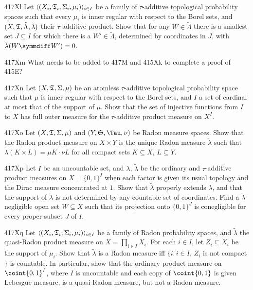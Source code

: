 {\spheader 417Xl Let
$\langle(X_i,\frak T_i,\Sigma_i,\mu_i)\rangle_{i\in I}$ be a family of
$\tau$-additive topological probability spaces such
that every $\mu_i$ is inner regular with respect to the Borel sets, and
$(X,\frak T,\tilde\Lambda,\tilde\lambda)$ their $\tau$-additive product.
Show that for any $W\in\tilde\Lambda$ there is a smallest set
$J\subseteq I$ for which there is a $W'\in\tilde\Lambda$, determined by
coordinates in $J$, with $\tilde\lambda(W\symmdiff W')=0$.  

\spheader 417Xm What needs to be added to 417M and 415Xk
to complete a proof of 415E?

\spheader 417Xn Let $(X,\frak T,\Sigma,\mu)$ be an atomless
$\tau$-additive topological probability space such that $\mu$ is inner
regular with respect to the Borel sets, and $I$ a set of cardinal at
most that of the support of $\mu$.   Show that the set of injective
functions from $I$ to $X$ has full outer measure for the $\tau$-additive
product measure on $X^I$.

\sqheader 417Xo Let $(X,\frak T,\Sigma,\mu)$ and $(Y,\frak S,\Tau,\nu)$
be Radon measure spaces.   Show that the Radon product measure on
$X\times Y$ is the unique Radon measure $\tilde\lambda$ such that
$\tilde\lambda(K\times L)=\mu K\cdot\nu L$ for all compact sets
$K\subseteq X$, $L\subseteq Y$.

\sqheader 417Xp Let $I$ be an uncountable set, and $\lambda$,
$\tilde\lambda$ be the ordinary and $\tau$-additive product measures on
$X=\{0,1\}^I$ when each factor is given its usual topology and the Dirac
measure concentrated at $1$.   Show that $\tilde\lambda$ properly extends
$\lambda$, and that the support of
$\tilde\lambda$ is not determined by any countable
set of coordinates.   Find a $\tilde\lambda$-negligible open set
$W\subseteq X$ such that its
projection onto $\{0,1\}^J$ is conegligible for every proper subset
$J$ of $I$.

\spheader 417Xq Let $\langle(X_i,\frak T_i,\Sigma_i,\mu_i)\rangle_{i\in
I}$ be a family of Radon probability spaces, and $\tilde\lambda$ the
quasi-Radon product measure on $X=\prod_{i\in I}X_i$.   For each $i\in
I$, let $Z_i\subseteq X_i$ be the support of $\mu_i$.   Show that
$\tilde\lambda$ is a Radon measure iff
$\{i:i\in I,\,Z_i$ is not compact$\}$ is countable.
In particular, show that the ordinary product measure on
$\coint{0,1}^I$, where $I$ is uncountable and
each copy of $\coint{0,1}$ is given Lebesgue measure, is a quasi-Radon
measure, but not a Radon measure.

}
